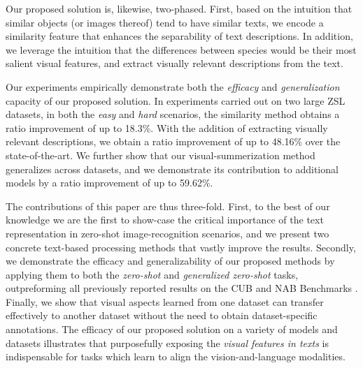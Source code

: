 \documentclass[11pt,a4paper]{article}
\newcommand\gal[1]{\textcolor{bright}{\textbf{GAL:} #1 }}
\newcommand\reut[1]{\textcolor{green}{\textbf{REUT:} #1 }}
\begin{document}
Our proposed solution is, likewise, two-phased. First,
based on the intuition that similar objects (or images thereof) tend to have similar texts,  %
we encode a similarity feature that  enhances the separability of  text descriptions. %
In addition, we leverage the intuition that the differences between species would be their most salient visual features, and extract visually relevant  descriptions from the text.



Our experiments empirically demonstrate both the {\em efficacy} and  {\em generalization} capacity of our proposed solution. 
In experiments carried out on two large ZSL datasets, %
in both the {\em easy} and {\em hard} scenarios, the similarity method obtains a ratio improvement of up to 18.3\%. With the addition of extracting visually relevant descriptions, we obtain a ratio improvement of up to 48.16\% over the state-of-the-art.
We further show that our visual-summerization method generalizes across datasets, and we demonstrate its contribution to additional models by a ratio improvement of up to 59.62\%.



The contributions of this paper are thus three-fold.
First,  to the best of our knowledge we are the first to show-case the critical importance of the text representation in zero-shot image-recognition scenarios, and we present two concrete text-based processing methods that vastly improve the results.
Secondly, we demonstrate the efficacy and generalizability of our proposed methods by applying them to both the {\em zero-shot} and {\em generalized zero-shot} tasks, outpreforming all previously reported results on the CUB and NAB Benchmarks \citep{wah2011caltech, van2015building}. Finally, we show that visual aspects learned from one dataset can transfer effectively  to another dataset without the need to obtain dataset-specific annotations.  
The efficacy of our proposed solution on a variety of models and datasets illustrates that purposefully exposing the {\em visual features in texts} is indispensable  for tasks which learn to align the  vision-and-language modalities. %
\end{document}
